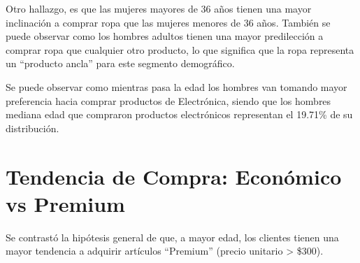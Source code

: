 \documentclass[oneside,11pt]{Latex/Classes/PhDthesisPSnPDF}
\begin{document}
Otro hallazgo, es que las mujeres mayores de 36 años tienen una mayor
inclinación a comprar ropa que las mujeres menores de 36 años. También
se puede observar como los hombres adultos tienen una mayor predilección
a comprar ropa que cualquier otro producto, lo que significa que la ropa
representa un ``producto ancla'' para este segmento demográfico.

Se puede observar como mientras pasa la edad los hombres van tomando
mayor preferencia hacia comprar productos de Electrónica, siendo que los
hombres mediana edad que compraron productos electrónicos representan el
19.71\% de su distribución.

\clearpage

\section{Tendencia de Compra: Económico vs Premium}

Se contrastó la hipótesis general de que, a mayor edad, los clientes
tienen una mayor tendencia a adquirir artículos ``Premium'' (precio
unitario \textgreater{} \$300).
\end{document}
